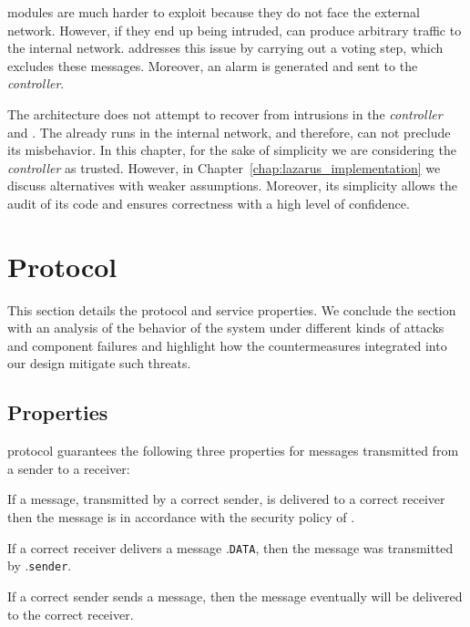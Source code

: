 \Repsieves modules are much harder to exploit because they do not face the external network. 
However, if they end up being intruded, \repsieves can produce arbitrary traffic to the internal network. 
\Postsieve addresses this issue by carrying out a voting step, which excludes these messages. Moreover, an alarm is generated and sent to the \emph{controller}.

The \sieveq architecture does not attempt to recover from intrusions in the \emph{controller} and \postsieve.
The \postsieve already runs in the internal network, and therefore, \sieveq can not preclude its misbehavior.
In this chapter, for the sake of simplicity we are considering the \emph{controller} as trusted.
However, in Chapter~\ref{chap:lazarus_implementation} we discuss alternatives with weaker assumptions.
Moreover, its simplicity allows the audit of its code and ensures correctness with a high level of confidence.


\section{\sieveq Protocol}
\label{protocol}

This section details the \sieveq protocol and service properties. 
We conclude the section with an analysis of the behavior of the system under different kinds of attacks and component failures and highlight how the countermeasures integrated into our design mitigate such threats.

\subsection{Properties}
\label{properties}

\sieveq protocol guarantees the following three properties for messages transmitted from a sender to a receiver:

\begin{security}
If a message, transmitted by a correct sender, is delivered to a correct receiver then the message is in accordance with the security policy of \sieveq.
\end{security}

\begin{validity}
If a correct receiver delivers a message \msg.\texttt{DATA}, then the message was transmitted by \msg.\texttt{sender}.
\end{validity}

\begin{liveness}
If a correct sender sends a message, then the message eventually will be delivered to the correct receiver.
\end{liveness}

